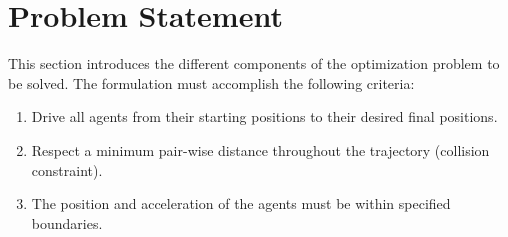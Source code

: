 \section{Problem Statement}
\label{sec:formulation}

This section introduces the different components of the optimization problem to be solved. The formulation must accomplish the following criteria:
\begin{enumerate}
	\item Drive all agents from their starting positions to their desired final positions.
	\item Respect a minimum pair-wise distance throughout the trajectory (collision constraint).
	\item The position and acceleration of the agents must be within specified boundaries.
\end{enumerate}

